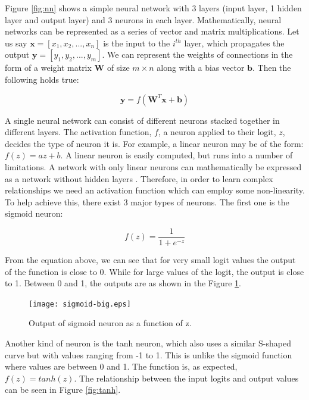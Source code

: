 Figure \ref{fig:nn} shows a simple neural network with 3 layers (input layer, 1 hidden layer and output layer) and 3 neurons in each layer. Mathematically, neural networks can be represented as a series of vector and matrix multiplications. Let us say $\boldsymbol{x} = [x_1, x_2,...,x_n]$ is the input to the $i^{th}$ layer, which propagates the output $\boldsymbol{y} = [y_1, y_2,...,y_m]$. We can represent the weights of connections in the form of a weight matrix $\boldsymbol{W}$ of size $m\times n$ along with a bias vector $\boldsymbol{b}$. Then the following holds true:

\begin{equation}
\boldsymbol{y} = f(\boldsymbol{W}^T\boldsymbol{x} + \boldsymbol{b})
\end{equation}

A single neural network can consist of different neurons stacked together in different layers. The activation function, $f$, a neuron applied to their logit, $z$, decides the type of neuron it is. For example, a linear neuron may be of the form: $f(z) = az + b$. A linear neuron is easily computed, but runs into a number of limitations. A network with only linear neurons can mathematically be expressed as a network without hidden layers \cite{buduma2017fundamentals}. Therefore, in order to learn complex relationships we need an activation function which can employ some non-linearity. To help achieve this, there exist 3 major types of neurons. The first one is the sigmoid neuron:

\begin{equation}
f(z) = \frac{1}{1+e^{-z}}
\end{equation}

From the equation above, we can see that for very small logit values the output of the function is close to 0. While for large values of the logit, the output is close to 1. Between 0 and 1, the outputs are as shown in the Figure \ref{fig:sigmoid}.

\begin{figure}[!h]
	\centering
	\texttt{[image: sigmoid-big.eps]}
	\hspace{1mm}
	\caption{Output of sigmoid neuron as a function of z.} 
	\label{fig:sigmoid}
\end{figure}

Another kind of neuron is the tanh neuron, which also uses a similar S-shaped curve but with values ranging from -1 to 1. This is unlike the sigmoid function where values are between 0 and 1. The function is, as expected, $f(z) = tanh(z)$. The relationship between the input logits and output values can be seen in Figure \ref{fig:tanh}.

